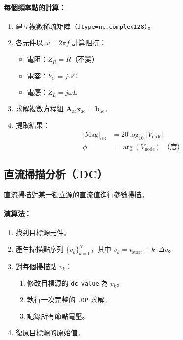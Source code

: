 \documentclass[12pt,a4paper]{article}
\begin{document}
\paragraph{每個頻率點的計算：}
\begin{enumerate}
  \item 建立複數稀疏矩陣（\texttt{dtype=np.complex128}）。
  \item 各元件以 $\omega = 2\pi f$ 計算阻抗：
    \begin{itemize}
      \item 電阻：$Z_R = R$（不變）
      \item 電容：$Y_C = j\omega C$
      \item 電感：$Z_L = j\omega L$
    \end{itemize}
  \item 求解複數方程組 $\mathbf{A}_{\text{ac}} \mathbf{x}_{\text{ac}} = \mathbf{b}_{\text{ac}}$。
  \item 提取結果：
    \begin{align}
      |\text{Mag}|_{\text{dB}} &= 20\log_{10}|V_{\text{node}}| \\
      \phi &= \arg(V_{\text{node}}) \text{ （度）}
    \end{align}
\end{enumerate}

\subsection{直流掃描分析（.DC）}

直流掃描對某一獨立源的直流值進行參數掃描。

\paragraph{演算法：}
\begin{enumerate}
  \item 找到目標源元件。
  \item 產生掃描點序列 $\{v_k\}_{k=0}^{N}$，其中 $v_k = v_{\text{start}} + k \cdot \Delta v$。
  \item 對每個掃描點 $v_k$：
    \begin{enumerate}[label=(\alph*)]
      \item 修改目標源的 \texttt{dc\_value} 為 $v_k$。
      \item 執行一次完整的 \texttt{.OP} 求解。
      \item 記錄所有節點電壓。
    \end{enumerate}
  \item 復原目標源的原始值。
\end{enumerate}
\end{document}
